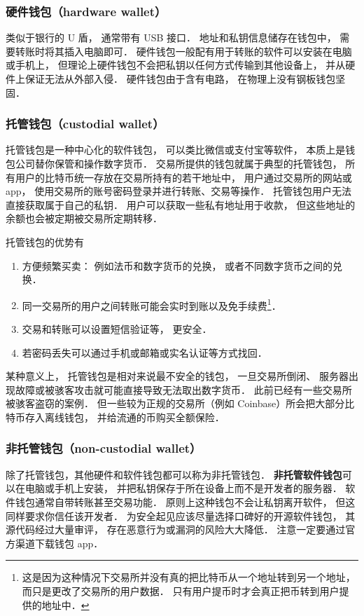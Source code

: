\subsubsection{硬件钱包（hardware wallet）}
类似于银行的 U 盾， 通常带有 USB 接口． 地址和私钥信息储存在钱包中， 需要转账时将其插入电脑即可． 硬件钱包一般配有用于转账的软件可以安装在电脑或手机上， 但理论上硬件钱包不会把私钥以任何方式传输到其他设备上， 并从硬件上保证无法从外部入侵． 硬件钱包由于含有电路， 在物理上没有钢板钱包坚固．

\subsubsection{托管钱包（custodial wallet）}
托管钱包是一种中心化的软件钱包， 可以类比微信或支付宝等软件， 本质上是钱包公司替你保管和操作数字货币． 交易所提供的钱包就属于典型的托管钱包， 所有用户的比特币统一存放在交易所持有的若干地址中， 用户通过交易所的网站或 app， 使用交易所的账号密码登录并进行转账、交易等操作． 托管钱包用户无法直接获取属于自己的私钥． 用户可以获取一些私有地址用于收款， 但这些地址的余额也会被定期被交易所定期转移．

托管钱包的优势有
\begin{enumerate}
\item 方便频繁买卖： 例如法币和数字货币的兑换， 或者不同数字货币之间的兑换．
\item 同一交易所的用户之间转账可能会实时到账以及免手续费\footnote{这是因为这种情况下交易所并没有真的把比特币从一个地址转到另一个地址， 而只是更改了交易所的用户数据． 只有用户提币时才会真正把币转到用户提供的地址中．}．
\item 交易和转账可以设置短信验证等， 更安全．
\item 若密码丢失可以通过手机或邮箱或实名认证等方式找回．
\end{enumerate}
某种意义上， 托管钱包是相对来说最不安全的钱包， 一旦交易所倒闭、 服务器出现故障或被骇客攻击就可能直接导致无法取出数字货币． 此前已经有一些交易所被骇客盗窃的案例． 但一些较为正规的交易所（例如 Coinbase）所会把大部分比特币存入离线钱包， 并给流通的币购买全额保险．

\subsubsection{非托管钱包（non-custodial wallet）}
除了托管钱包，其他硬件和软件钱包都可以称为非托管钱包． \textbf{非托管软件钱包}可以在电脑或手机上安装， 并把私钥保存于所在设备上而不是开发者的服务器． 软件钱包通常自带转账甚至交易功能． 原则上这种钱包不会让私钥离开软件， 但这同样要求你信任该开发者． 为安全起见应该尽量选择口碑好的开源软件钱包， 其源代码经过大量审评， 存在恶意行为或漏洞的风险大大降低． 注意一定要通过官方渠道下载钱包 app．

